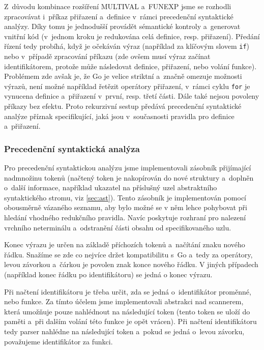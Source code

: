 \documentclass[11pt]{article}
\begin{document}
Z~důvodu kombinace rozšíření MULTIVAL a~FUNEXP jsme se rozhodli zpracovávat i~příkaz přiřazení a~definice v~rámci precedenční syntaktické analýzy. Díky tomu je jednodušší provádět sémantické kontroly a~generovat vnitřní kód (v~jednom kroku je redukována celá definice, resp. přiřazení). Předání řízení tedy probíhá, když je očekáván výraz (například za klíčovým slovem \texttt{if}) nebo v~případě zpracování příkazu (zde ovšem musí výraz začínat identifikátorem, protože může následovat definice, přiřazení, nebo volání funkce). Problémem zde avšak je, že Go je velice striktní a~značně omezuje možnosti výrazů, není možné například řetězit operátory přiřazení, v~rámci cyklu \texttt{for} je vynucena definice a~přiřazení v~první, resp. třetí části. Dále také nejsou povoleny příkazy bez efektu. Proto rekurzivní sestup předává precedenční syntaktické analýze příznak specifikující, jaká jsou v~současnosti pravidla pro definice a~přiřazení.

\subsubsection{Precedenční syntaktická analýza}
\label{precedence}

Pro precedenční syntaktickou analýzu jsme implementovali zásobník přijímající nadmnožinu tokenů (načtený token je nakopírován do nové struktury a~doplněn o~další informace, například ukazatel na příslušný uzel abstraktního syntaktického stromu, viz \ref{sec:ast}). Tento zásobník je implementován pomocí obousměrně vázaného seznamu, aby bylo možné se v něm lehce pohybovat při hledání vhodného redukčního pravidla. Navíc poskytuje rozhraní pro nalezení vrchního neterminálu a~odstranění části obsahu od specifikovaného uzlu.

Konec výrazu je určen na základě příchozích tokenů a~načítání znaku nového řádku. Snažíme se zde co nejvíce držet kompatibilitu s~Go a~tedy za operátory, levou závorkou a~čárkou je povolen znak konce nového řádku. V jiných případech (například konec řádku po identifikátoru) se jedná o konec výrazu.

Při načtení identifikátoru je třeba určit, zda se jedná o~identifikátor proměnné, nebo funkce. Za tímto účelem jsme implementovali abstrakci nad scannerem, která umožňuje pouze nahlédnout na následující token (tento token se uloží do paměti a~při dalším volání této funkce je opět vrácen). Při načtení identifikátoru tedy parser nahlédne na následující token a~pokud se jedná o~levou závorku, považujeme identifikátor za funkci.
\end{document}
